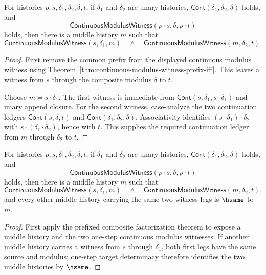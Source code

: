 \begin{theorem}
\label{thm:continuous-modulus-witness-prefixed-composite-factorizes}
For histories $p,s,\delta_1,\delta_2,\delta,t$, if $\delta_1$ and $\delta_2$
are unary histories, $\mathsf{Cont}(\delta_1,\delta_2,\delta)$ holds, and
$$
\mathsf{ContinuousModulusWitness}(p\cdot s,\delta,p\cdot t)
$$
holds, then there is a middle history $m$ such that
$$
\mathsf{ContinuousModulusWitness}(s,\delta_1,m)
\quad\land\quad
\mathsf{ContinuousModulusWitness}(m,\delta_2,t).
$$
\end{theorem}
\begin{proof}
First remove the common prefix from the displayed continuous modulus witness
using Theorem~\ref{thm:continuous-modulus-witness-prefix-iff}. This leaves a
witness from $s$ through the composite modulus $\delta$ to $t$.

Choose $m=s\cdot\delta_1$. The first witness is immediate from
$\mathsf{Cont}(s,\delta_1,s\cdot\delta_1)$ and unary append closure. For the
second witness, case-analyze the two continuation ledgers
$\mathsf{Cont}(s,\delta,t)$ and $\mathsf{Cont}(\delta_1,\delta_2,\delta)$.
Associativity identifies $(s\cdot\delta_1)\cdot\delta_2$ with
$s\cdot(\delta_1\cdot\delta_2)$, hence with $t$. This supplies the required
continuation ledger from $m$ through $\delta_2$ to $t$.
\end{proof}

\begin{theorem}
\label{thm:continuous-modulus-witness-prefixed-composite-middle-deterministic-factorization}
For histories $p,s,\delta_1,\delta_2,\delta,t$, if $\delta_1$ and $\delta_2$
are unary histories, $\mathsf{Cont}(\delta_1,\delta_2,\delta)$ holds, and
$$
\mathsf{ContinuousModulusWitness}(p\cdot s,\delta,p\cdot t)
$$
holds, then there is a middle history $m$ such that
$$
\mathsf{ContinuousModulusWitness}(s,\delta_1,m)
\quad\land\quad
\mathsf{ContinuousModulusWitness}(m,\delta_2,t),
$$
and every other middle history carrying the same two witness legs is $\hsame$
to $m$.
\end{theorem}
\begin{proof}
First apply the prefixed composite factorization theorem to expose a middle
history and the two one-step continuous modulus witnesses. If another middle
history carries a witness from $s$ through $\delta_1$, both first legs have the
same source and modulus; one-step target determinacy therefore identifies the
two middle histories by $\hsame$.
\end{proof}

